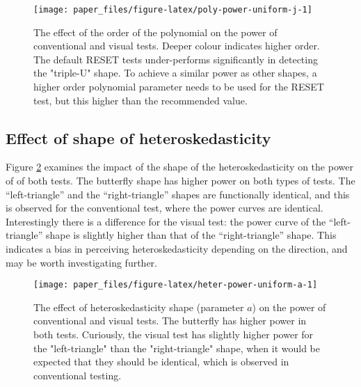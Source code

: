 \documentclass[]{interact}
\theoremstyle{plain}%
\theoremstyle{definition}
\theoremstyle{remark}
\begin{document}
\begin{figure}

{\centering \texttt{[image: paper\_files/figure-latex/poly-power-uniform-j-1]} 

}

\caption{The effect of the order of the polynomial on the power of conventional and visual tests. Deeper colour indicates higher order. The default RESET tests under-performs significantly in detecting the "triple-U" shape. To achieve a similar power as other shapes, a higher order polynomial parameter needs to be used for the RESET test, but this higher than the recommended value.}\label{fig:poly-power-uniform-j}
\end{figure}

\hypertarget{effect-of-shape-of-heteroskedasticity}{%
\subsection{\texorpdfstring{Effect of shape of
heteroskedasticity\label{hetero-analysis}}{Effect of shape of heteroskedasticity}}\label{effect-of-shape-of-heteroskedasticity}}

Figure \ref{fig:heter-power-uniform-a} examines the impact of the shape
of the heteroskedasticity on the power of of both tests. The butterfly
shape has higher power on both types of tests. The ``left-triangle'' and
the ``right-triangle'' shapes are functionally identical, and this is
observed for the conventional test, where the power curves are
identical. Interestingly there is a difference for the visual test: the
power curve of the ``left-triangle'' shape is slightly higher than that
of the ``right-triangle'' shape. This indicates a bias in perceiving
heteroskedasticity depending on the direction, and may be worth
investigating further.

\begin{figure}

{\centering \texttt{[image: paper\_files/figure-latex/heter-power-uniform-a-1]} 

}

\caption{The effect of heteroskedasticity shape (parameter $a$) on the power of conventional and visual tests. The butterfly has higher power in both tests. Curiously, the visual test has slightly higher power for the "left-triangle" than the "right-triangle" shape, when it would be expected that they should be identical, which is observed in conventional testing.}\label{fig:heter-power-uniform-a}
\end{figure}
\end{document}
